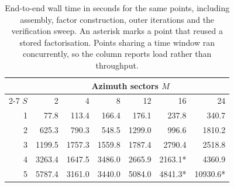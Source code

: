 \begin{table}[htbp]
\centering
\caption{End-to-end wall time in seconds for the same points, including assembly, factor construction, outer iterations and the verification sweep. An asterisk marks a point that reused a stored factorisation. Points sharing a time window ran concurrently, so the column reports load rather than throughput.}
\label{tab:study4-core-time}
\begin{tabular}{rrrrrrr}
\hline
 & \multicolumn{6}{c}{Azimuth sectors $M$}\\
\cline{2-7}
$S$ & 2 & 4 & 8 & 12 & 16 & 24\\
\hline
1 & 77.8 & 113.4 & 166.4 & 176.1 & 237.8 & 340.7 \\
2 & 625.3 & 790.3 & 548.5 & 1299.0 & 996.6 & 1810.2 \\
3 & 1199.5 & 1757.3 & 1559.8 & 1787.4 & 2790.4 & 2518.8 \\
4 & 3263.4 & 1647.5 & 3486.0 & 2665.9 & 2163.1* & 4360.9 \\
5 & 5787.4 & 3161.0 & 3440.0 & 5084.0 & 4841.3* & 10930.6* \\
\hline
\end{tabular}
\end{table}
